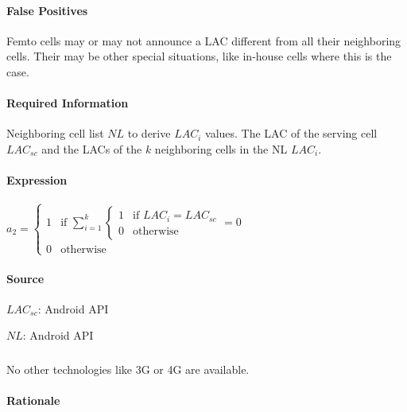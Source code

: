 \documentclass[a4paper,11pt,notitlepage,bigheadings,oneside]{scrartcl}
\begin{document}
\paragraph{False Positives}

Femto cells may or may not announce a LAC different from all their neighboring
cells. Their may be other special situations, like in-house cells where this is
the case.

\paragraph{Required Information}

Neighboring cell list $NL$ to derive $LAC_i$ values. The LAC of the serving
cell $LAC_{sc}$ and the LACs of the $k$ neighboring cells in the NL $LAC_i$.

\paragraph{Expression}

$a_2 =
\begin{cases}
	1 & \text{if } \displaystyle\sum_{i=1}^{k}
                        \begin{cases}
	                        1 & \text{if } LAC_i = LAC_{sc} \\
	                        0 & \text{otherwise}
                        \end{cases} = 0\\
        0 & \text{otherwise}
        \end{cases}
$

\paragraph{Source}

$LAC_{sc}$: Android API

        
$NL$: Android API

        
\subsubsection{}

No other technologies like 3G or 4G are available.

\paragraph{Rationale}
\end{document}

